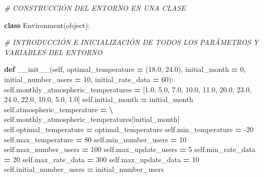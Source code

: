 \documentclass[]{book}
\newenvironment{Shaded}{\begin{snugshade}}{\end{snugshade}}
\newcommand{\BuiltInTok}[1]{#1}
\newcommand{\CommentTok}[1]{\textcolor[rgb]{0.56,0.35,0.01}{\textit{#1}}}
\newcommand{\DecValTok}[1]{\textcolor[rgb]{0.00,0.00,0.81}{#1}}
\newcommand{\FloatTok}[1]{\textcolor[rgb]{0.00,0.00,0.81}{#1}}
\newcommand{\FunctionTok}[1]{\textcolor[rgb]{0.00,0.00,0.00}{#1}}
\newcommand{\KeywordTok}[1]{\textcolor[rgb]{0.13,0.29,0.53}{\textbf{#1}}}
\newcommand{\NormalTok}[1]{#1}
\newcommand{\OperatorTok}[1]{\textcolor[rgb]{0.81,0.36,0.00}{\textbf{#1}}}
\newcommand{\VariableTok}[1]{\textcolor[rgb]{0.00,0.00,0.00}{#1}}
\begin{document}
\begin{Shaded}
\begin{Highlighting}[]
\CommentTok{# CONSTRUCCIÓN DEL ENTORNO EN UNA CLASE}

\KeywordTok{class}\NormalTok{ Environment(}\BuiltInTok{object}\NormalTok{):}

    \CommentTok{# INTRODUCCIÓN E INICIALIZACIÓN DE TODOS LOS PARÁMETROS Y VARIABLES DEL ENTORNO}

    \KeywordTok{def} \FunctionTok{__init__}\NormalTok{(}\VariableTok{self}\NormalTok{,}
\NormalTok{                optimal_temperature }\OperatorTok{=}\NormalTok{ (}\FloatTok{18.0}\NormalTok{, }\FloatTok{24.0}\NormalTok{),}
\NormalTok{                initial_month }\OperatorTok{=} \DecValTok{0}\NormalTok{,}
\NormalTok{                initial_number_users }\OperatorTok{=} \DecValTok{10}\NormalTok{,}
\NormalTok{                initial_rate_data }\OperatorTok{=} \DecValTok{60}\NormalTok{):}
        \VariableTok{self}\NormalTok{.monthly_atmospheric_temperatures }\OperatorTok{=}\NormalTok{ [}\FloatTok{1.0}\NormalTok{, }\FloatTok{5.0}\NormalTok{, }\FloatTok{7.0}\NormalTok{, }\FloatTok{10.0}\NormalTok{, }\FloatTok{11.0}\NormalTok{, }\FloatTok{20.0}\NormalTok{,}
                                                \FloatTok{23.0}\NormalTok{, }\FloatTok{24.0}\NormalTok{, }\FloatTok{22.0}\NormalTok{, }\FloatTok{10.0}\NormalTok{, }\FloatTok{5.0}\NormalTok{, }\FloatTok{1.0}\NormalTok{]}
        \VariableTok{self}\NormalTok{.initial_month }\OperatorTok{=}\NormalTok{ initial_month}
        \VariableTok{self}\NormalTok{.atmospheric_temperature }\OperatorTok{=} \OperatorTok{\textbackslash{}}
                                \VariableTok{self}\NormalTok{.monthly_atmospheric_temperatures[initial_month]}
        \VariableTok{self}\NormalTok{.optimal_temperature }\OperatorTok{=}\NormalTok{ optimal_temperature}
        \VariableTok{self}\NormalTok{.min_temperature }\OperatorTok{=} \DecValTok{-20}
        \VariableTok{self}\NormalTok{.max_temperature }\OperatorTok{=} \DecValTok{80}
        \VariableTok{self}\NormalTok{.min_number_users }\OperatorTok{=} \DecValTok{10}
        \VariableTok{self}\NormalTok{.max_number_users }\OperatorTok{=} \DecValTok{100}
        \VariableTok{self}\NormalTok{.max_update_users }\OperatorTok{=} \DecValTok{5}
        \VariableTok{self}\NormalTok{.min_rate_data }\OperatorTok{=} \DecValTok{20}
        \VariableTok{self}\NormalTok{.max_rate_data }\OperatorTok{=} \DecValTok{300}
        \VariableTok{self}\NormalTok{.max_update_data }\OperatorTok{=} \DecValTok{10}
        \VariableTok{self}\NormalTok{.initial_number_users }\OperatorTok{=}\NormalTok{ initial_number_users}

\end{Highlighting}
\end{Shaded}
\end{document}
